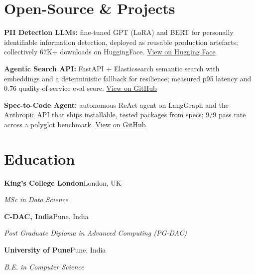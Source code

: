 \documentclass[10pt,a4paper]{article}
\begin{document}
\section{Open-Source \& Projects}
\begin{tight}
  \item \textbf{PII Detection LLMs:} fine-tuned GPT (LoRA) and BERT for personally identifiable information detection, deployed as reusable production artefacts; collectively 67K+ downloads on HuggingFace. \href{https://huggingface.co/ab-ai/pii_model}{View on Hugging Face}
  \item \textbf{Agentic Search API:} FastAPI + Elasticsearch semantic search with embeddings and a deterministic fallback for resilience; measured p95 latency and 0.76 quality-of-service eval score. \href{https://github.com/abhijeetscode/search-agent}{View on GitHub}
  \item \textbf{Spec-to-Code Agent:} autonomous ReAct agent on LangGraph and the Anthropic API that ships installable, tested packages from specs; 9/9 pass rate across a polyglot benchmark. \href{https://github.com/abhijeetscode/Spec-to-Code-Agent}{View on GitHub}
\end{tight}

\section{Education}
{\color{company}\bfseries King's College London}\hfill {\color{muted}London, UK}\par
{\itshape MSc in Data Science}\par\vspace{2pt}
{\color{company}\bfseries C-DAC, India}\hfill {\color{muted}Pune, India}\par
{\itshape Post Graduate Diploma in Advanced Computing (PG-DAC)}\par\vspace{2pt}
{\color{company}\bfseries University of Pune}\hfill {\color{muted}Pune, India}\par
{\itshape B.E. in Computer Science}\par
\end{document}
